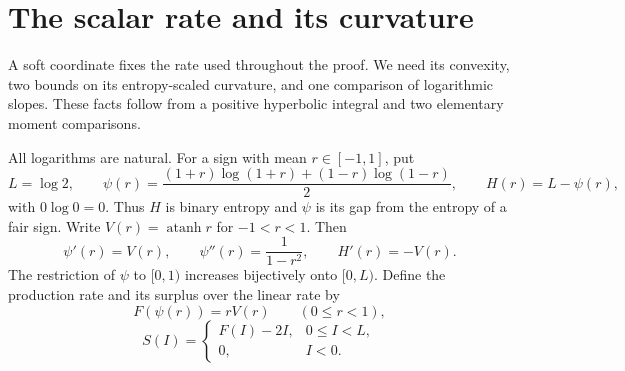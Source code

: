\section{The scalar rate and its curvature}
\label{scalar:section}

A soft coordinate fixes the rate used throughout the proof.  We need
its convexity, two bounds on its entropy-scaled curvature, and one
comparison of logarithmic slopes.  These facts follow from a positive
hyperbolic integral and two elementary moment comparisons.

All logarithms are natural.  For a sign with mean $r\in[-1,1]$, put
\begin{equation}
\label{scalar:entropy-definitions}
 L=\log 2,\qquad
 \psi(r)=\frac{(1+r)\log(1+r)+(1-r)\log(1-r)}2,\qquad
 H(r)=L-\psi(r),
\end{equation}
with $0\log0=0$.  Thus $H$ is binary entropy and $\psi$ is its
gap from the entropy of a fair sign.  Write
$V(r)=\operatorname{atanh}r$ for $-1<r<1$.  Then
\begin{equation}
\label{scalar:entropy-derivatives}
 \psi'(r)=V(r),\qquad \psi''(r)=\frac1{1-r^2},\qquad H'(r)=-V(r).
\end{equation}
The restriction of $\psi$ to $[0,1)$ increases bijectively onto
$[0,L)$.  Define the production rate and its surplus over the linear
rate by
\begin{equation}
\label{scalar:profile-definitions}
 F(\psi(r))=rV(r)\qquad(0\le r<1),
\end{equation}
\begin{equation}
\label{scalar:surplus-definition}
 S(I)=
 \begin{cases}
  F(I)-2I,&0\le I<L,\\
  0,&I<0.
 \end{cases}
\end{equation}

